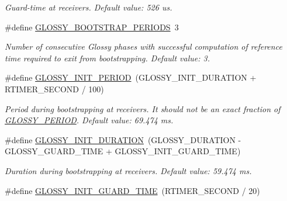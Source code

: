 \begin{DoxyCompactItemize}
\begin{DoxyCompactList}\small\item\em Guard-\/time at receivers. Default value: 526 us. \end{DoxyCompactList}\item 
\hypertarget{group__glossy-test-settings_ga8c2dcd42a2c913f0f80525a7c2eac3f1}{
\#define \hyperlink{group__glossy-test-settings_ga8c2dcd42a2c913f0f80525a7c2eac3f1}{GLOSSY\_\-BOOTSTRAP\_\-PERIODS}~3}
\label{group__glossy-test-settings_ga8c2dcd42a2c913f0f80525a7c2eac3f1}

\begin{DoxyCompactList}\small\item\em Number of consecutive Glossy phases with successful computation of reference time required to exit from bootstrapping. Default value: 3. \end{DoxyCompactList}\item 
\hypertarget{group__glossy-test-settings_ga21f18e3204161cd2b12f9979a28376f2}{
\#define \hyperlink{group__glossy-test-settings_ga21f18e3204161cd2b12f9979a28376f2}{GLOSSY\_\-INIT\_\-PERIOD}~(GLOSSY\_\-INIT\_\-DURATION + RTIMER\_\-SECOND / 100)}
\label{group__glossy-test-settings_ga21f18e3204161cd2b12f9979a28376f2}

\begin{DoxyCompactList}\small\item\em Period during bootstrapping at receivers. It should not be an exact fraction of \hyperlink{group__glossy-test-settings_ga6f68058577fdbfccbd8e50537609a5e4}{GLOSSY\_\-PERIOD}. Default value: 69.474 ms. \end{DoxyCompactList}\item 
\hypertarget{group__glossy-test-settings_gaa096b07a5e769ee16ce1e872b8fa9e96}{
\#define \hyperlink{group__glossy-test-settings_gaa096b07a5e769ee16ce1e872b8fa9e96}{GLOSSY\_\-INIT\_\-DURATION}~(GLOSSY\_\-DURATION -\/ GLOSSY\_\-GUARD\_\-TIME + GLOSSY\_\-INIT\_\-GUARD\_\-TIME)}
\label{group__glossy-test-settings_gaa096b07a5e769ee16ce1e872b8fa9e96}

\begin{DoxyCompactList}\small\item\em Duration during bootstrapping at receivers. Default value: 59.474 ms. \end{DoxyCompactList}\item 
\hypertarget{group__glossy-test-settings_gab6849986e590b8cd21c92f20901433ee}{
\#define \hyperlink{group__glossy-test-settings_gab6849986e590b8cd21c92f20901433ee}{GLOSSY\_\-INIT\_\-GUARD\_\-TIME}~(RTIMER\_\-SECOND / 20)}
\label{group__glossy-test-settings_gab6849986e590b8cd21c92f20901433ee}


\end{DoxyCompactItemize}
